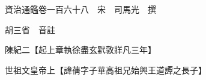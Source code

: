 










 


 
 


 

  
  
  
  
  





  
  
  
  
  
 
  

  

  
  
  



  

 
 

  
   




  

  
  


  　　資治通鑑卷一百六十八　宋　司馬光　撰

　　胡三省　音註

　　陳紀二【起上章執徐盡玄黓敦牂凡三年】

　　世祖文皇帝上【諱蒨字子華高祖兄始興王道譚之長子】

